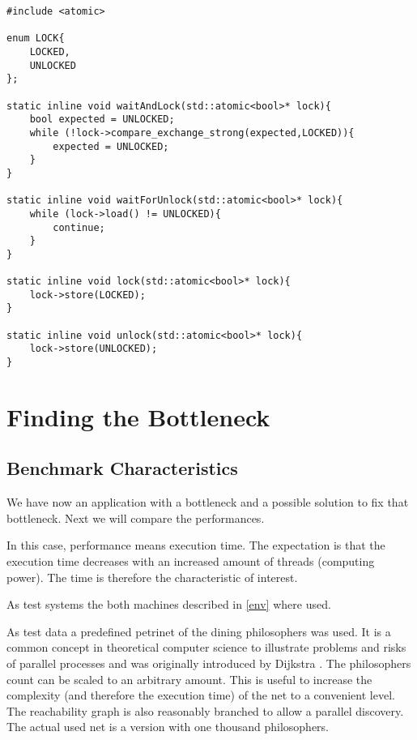\begin{lstlisting}
#include <atomic>

enum LOCK{
    LOCKED,
    UNLOCKED
};

static inline void waitAndLock(std::atomic<bool>* lock){
    bool expected = UNLOCKED;
    while (!lock->compare_exchange_strong(expected,LOCKED)){
        expected = UNLOCKED;
    }
}

static inline void waitForUnlock(std::atomic<bool>* lock){
    while (lock->load() != UNLOCKED){
        continue;
    }
}

static inline void lock(std::atomic<bool>* lock){
    lock->store(LOCKED);
}

static inline void unlock(std::atomic<bool>* lock){
    lock->store(UNLOCKED);
}
\end{lstlisting}

\section{Finding the Bottleneck}
\subsection{Benchmark Characteristics}
We have now an application with a bottleneck and a possible solution to fix that bottleneck. Next we will compare the performances.

In this case, performance means execution time. The expectation is that the execution time decreases with an increased amount of threads (computing power). The time is therefore the characteristic of interest.

As test systems the both machines described in \ref{env} where used.

As test data a predefined petrinet of the dining philosophers was used. It is a common concept in theoretical computer science to illustrate problems and risks of parallel processes and was originally introduced by Dijkstra \cite{dijkstra1971hierarchical}. The philosophers count can be scaled to an arbitrary amount. This is useful to increase the complexity (and therefore the execution time) of the net to a convenient level. The reachability graph is also reasonably branched to allow a parallel discovery. The actual used net is a version with one thousand philosophers.


